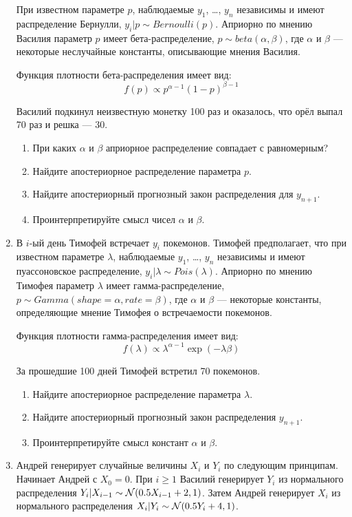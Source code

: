 \documentclass[12pt, a4paper]{article}\usepackage[]{graphicx}\usepackage[]{color}
\begin{document}
\begin{enumerate}
При известном параметре $p$, наблюдаемые $y_1$, \ldots, $y_n$ независимы и имеют распределение Бернулли, $y_i|p \sim Bernoulli(p)$. Априорно по мнению Василия параметр $p$ имеет бета-распределение, $p \sim beta(\alpha, \beta)$, где $\alpha$ и $\beta$ — некоторые неслучайные константы, описывающие мнения Василия.

Функция плотности бета-распределения имеет вид:
\[
f(p) \propto p^{\alpha - 1}(1-p)^{\beta-1}
\]

Василий подкинул неизвестную монетку 100 раз и оказалось, что орёл выпал 70 раз и решка — 30.

\begin{enumerate}
  \item При каких $\alpha$ и $\beta$ априорное распределение совпадает с равномерным?
  \item Найдите апостериорное распределение параметра $p$.
  \item Найдите апостериорный прогнозный закон распределения для $y_{n+1}$.
  \item Проинтерпретируйте смысл чисел $\alpha$ и $\beta$.
\end{enumerate}

\item В $i$-ый день Тимофей встречает $y_i$ покемонов. Тимофей предполагает, что при известном параметре $\lambda$, наблюдаемые $y_1$, \ldots, $y_n$ независимы и имеют пуассоновское распределение, $y_i|\lambda \sim Pois(\lambda)$. Априорно по мнению Тимофея параметр $\lambda$ имеет гамма-распределение, $p \sim Gamma(shape=\alpha, rate=\beta)$, где $\alpha$ и $\beta$ — некоторые константы, определяющие мнение Тимофея о встречаемости покемонов.

Функция плотности гамма-распределения имеет вид:
\[
f(\lambda) \propto \lambda^{\alpha - 1}\exp(-\lambda\beta)
\]

За прошедшие 100 дней Тимофей встретил 70 покемонов.


\begin{enumerate}
  \item Найдите апостериорное распределение параметра $\lambda$.
  \item Найдите апостериорный прогнозный закон распределения $y_{n+1}$.
  \item Проинтерпретируйте смысл констант $\alpha$ и $\beta$.
\end{enumerate}


\item Андрей генерирует случайные величины $X_i$ и $Y_i$ по следующим принципам. Начинает Андрей с $X_0=0$. При $i\geq 1$ Василий генерирует $Y_i$ из нормального распределения $Y_i|X_{i-1}\sim \mathcal{N}(0.5X_{i-1} + 2, 1)$. Затем Андрей генерирует $X_i$ из нормального распределения $X_i|Y_i \sim \mathcal{N}(0.5Y_i+4, 1)$.


\end{enumerate}
\end{document}

